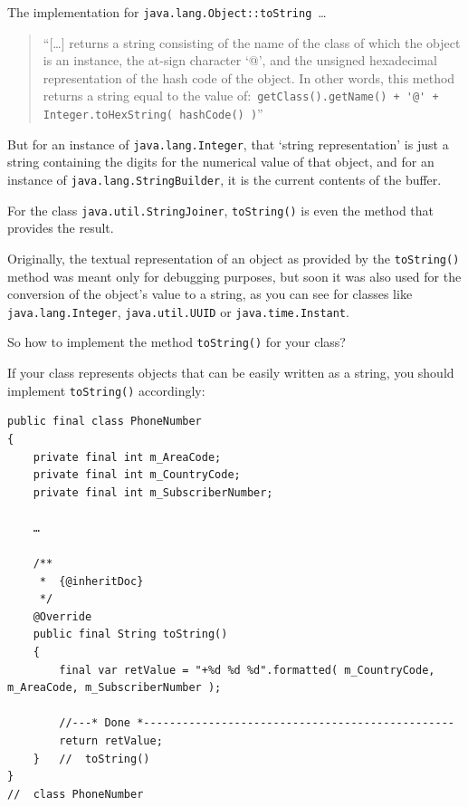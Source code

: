 \documentclass[11pt,a4paper, titlepage, parskip=half, headsepline, footsepline, cleardoublepage=current, headheight=1cm]{scrbook}
\begin{document}
The implementation for \lstinline|java.lang.Object::toString|~…
\begin{quote}
“[…] returns a string consisting of the name of the class of which the object is an instance, the at-sign character ‘@’, and the unsigned hexadecimal representation of the hash code of the object. In other words, this method returns a string equal to the value of:\
\lstinline|getClass().getName() + '@' + Integer.toHexString( hashCode() )|”
\end{quote}
But for an instance of \lstinline|java.lang.Integer|\autocite{ORACLE_DOC_INTEGER_CLASS}, that ‘string representation’ is just a string containing the digits for the numerical value of that object, and for an instance of \lstinline|java.lang.StringBuilder|\autocite{ORACLE_DOC_STRINGBUILDER_CLASS}, it is the current contents of the buffer.

For the class \lstinline|java.util.StringJoiner|\autocite{ORACLE_DOC_STRINGJOINER_CLASS}, \lstinline|toString()| is even the method that provides the result.

Originally, the textual representation of an object as provided by the \lstinline|toString()| method was meant only for debugging purposes, but soon it was also used for the conversion of the object's value to a string, as you can see for classes like \lstinline|java.lang.Integer|, \lstinline|java.util.UUID| or \lstinline|java.time.Instant|.

So how to implement the method \lstinline|toString()| for your class?

If your class represents objects that can be easily written as a string, you should implement \lstinline|toString()| accordingly:
\begin{lstlisting}
public final class PhoneNumber
{
    private final int m_AreaCode;
    private final int m_CountryCode;
    private final int m_SubscriberNumber;
    
    …
    
    /**
     *  {@inheritDoc}
     */
    @Override 
    public final String toString()
    {
        final var retValue = "+%d %d %d".formatted( m_CountryCode, m_AreaCode, m_SubscriberNumber );
        
        //---* Done *------------------------------------------------
        return retValue;
    }   //  toString()
}   
//  class PhoneNumber
\end{lstlisting}
\end{document}
